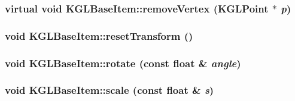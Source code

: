 \hypertarget{class_k_g_l_base_item_58c4e6cb39b23d5f313f425cf9afc99c}{
\subsubsection[{removeVertex}]{\setlength{\rightskip}{0pt plus 5cm}virtual void KGLBaseItem::removeVertex ({\bf KGLPoint} $\ast$ {\em p})}}
\label{class_k_g_l_base_item_58c4e6cb39b23d5f313f425cf9afc99c}


\hypertarget{class_k_g_l_base_item_5aa1d880fffcc82847dc7eff4e7aecba}{
\subsubsection[{resetTransform}]{\setlength{\rightskip}{0pt plus 5cm}void KGLBaseItem::resetTransform ()}}
\label{class_k_g_l_base_item_5aa1d880fffcc82847dc7eff4e7aecba}


\hypertarget{class_k_g_l_base_item_e3f4ea29b0d2da2a296ddbb80ea88738}{
\subsubsection[{rotate}]{\setlength{\rightskip}{0pt plus 5cm}void KGLBaseItem::rotate (const float \& {\em angle})}}
\label{class_k_g_l_base_item_e3f4ea29b0d2da2a296ddbb80ea88738}


\hypertarget{class_k_g_l_base_item_03c0cf1d821aebbe56d0a15681c17f1f}{
\subsubsection[{scale}]{\setlength{\rightskip}{0pt plus 5cm}void KGLBaseItem::scale (const float \& {\em s})}}
\label{class_k_g_l_base_item_03c0cf1d821aebbe56d0a15681c17f1f}


